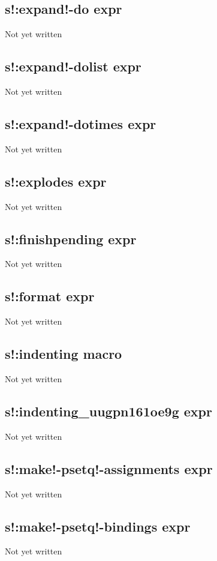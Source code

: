 \documentclass[a4paper,11pt]{article}
\begin{document}
\subsection{\ttfamily s!:expand!-do expr}
Not yet written

\subsection{\ttfamily s!:expand!-dolist expr}
Not yet written

\subsection{\ttfamily s!:expand!-dotimes expr}
Not yet written

\subsection{\ttfamily s!:explodes expr}
Not yet written

\subsection{\ttfamily s!:finishpending expr}
Not yet written

\subsection{\ttfamily s!:format expr}
Not yet written

\subsection{\ttfamily s!:indenting macro}
Not yet written

\subsection{\ttfamily s!:indenting\_uugpn161oe9g expr}
Not yet written

\subsection{\ttfamily s!:make!-psetq!-assignments expr}
Not yet written

\subsection{\ttfamily s!:make!-psetq!-bindings expr}
Not yet written
\end{document}
